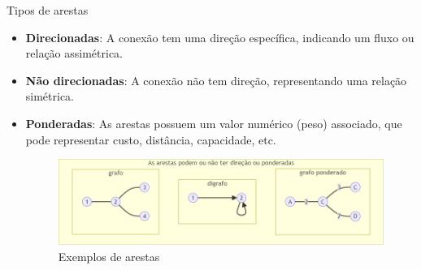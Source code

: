 \documentclass{if-beamer}
\begin{document}
\begin{frame}{Tipos de arestas} 
\begin{itemize}
\justifying
\item \textbf{Direcionadas}: A conexão tem uma direção específica, indicando um fluxo ou relação assimétrica.
\item \textbf{Não direcionadas}: A conexão não tem direção, representando uma relação simétrica.
\item \textbf{Ponderadas}: As arestas possuem um valor numérico (peso) associado, que pode representar custo, distância, capacidade, etc.
\begin{figure}
  \centering
  \includegraphics[scale=0.35]{Figuras/exemplos-grafo/i.png}
  \caption{Exemplos de arestas}
\end{figure}

\end{itemize} 
\end{frame}
\end{document}
